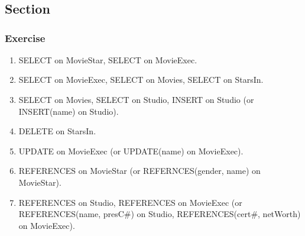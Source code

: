 
\setcounter{chapter}{9}
\chapter{}

\setcounter{section}{1}
\section*{Section \thesection}

\setcounter{subsection}{1}
\subsection*{Exercise \thesubsection}

\renewcommand{\theenumi}{(\alph{enumi})}
\renewcommand{\labelenumi}{\theenumi}


\begin{enumerate}
\item
SELECT on MovieStar, SELECT on MovieExec.
\item
SELECT on MovieExec, SELECT on Movies, SELECT on StarsIn.
\item
SELECT on Movies, SELECT on Studio, INSERT on Studio (or INSERT(name) on Studio).
\item
DELETE on StarsIn.
\item
UPDATE on MovieExec (or UPDATE(name) on MovieExec).
\item
REFERENCES on MovieStar (or REFERNCES(gender, name) on MovieStar).
\item
REFERENCES on Studio, REFERENCES on MovieExec (or REFERENCES(name, presC\#) on Studio,
REFERENCES(cert\#, netWorth) on MovieExec).
\end{enumerate}


\setcounter{subsection}{2}
